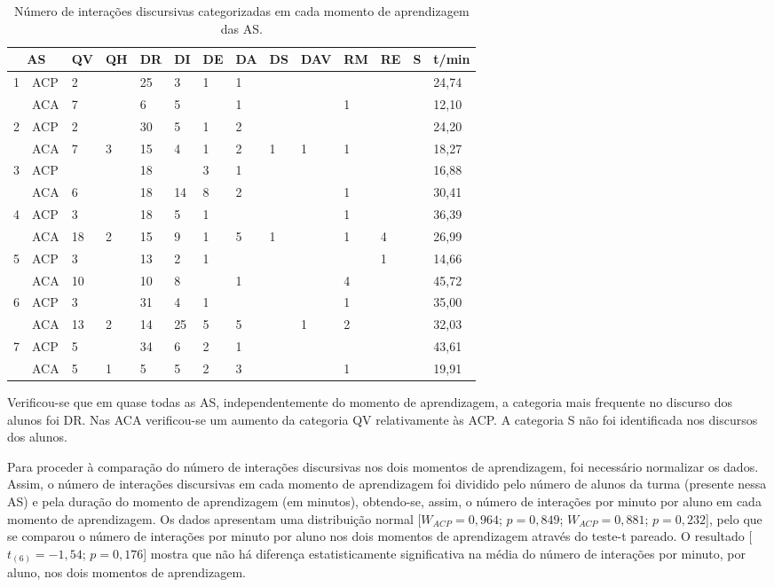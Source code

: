\documentclass[portuguese]{textolivre}
\begin{document}
\begin{table}[htb]
\caption{Número de interações discursivas categorizadas em cada momento de aprendizagem das AS.}
\label{tab2}
\centering
\begin{tabular}{llllllllllllll}
\toprule
\multicolumn{2}{c}{AS} & QV & QH & DR & DI & DE & DA & DS & DAV & RM & RE & S & t/min
\\
\midrule
\multirow{2}{*}{1} & ACP & 2 & & 25 & 3 & 1 & 1 & & & & & & 24,74
\\
& ACA & 7 & & 6 & 5 &  & 1 & & & 1 & & & 12,10
\\
\hline
\multirow{2}{*}{2} & ACP & 2 & & 30 & 5 & 1 & 2 & & & & & & 24,20
\\
& ACA & 7 & 3 & 15 & 4 & 1 & 2 & 1 & 1 & 1 & & & 18,27
\\
\hline
\multirow{2}{*}{3} & ACP & & & 18 & & 3 & 1 & & & & & & 16,88
\\
& ACA & 6 & & 18 & 14 & 8 & 2 & & & 1 & & & 30,41
\\
\hline
\multirow{2}{*}{4} & ACP & 3 & & 18 & 5 & 1 & & & & 1 & & & 36,39
\\
& ACA & 18 & 2 & 15 & 9 & 1 & 5 & 1 & & 1 & 4 & & 26,99
\\
\hline
\multirow{2}{*}{5} & ACP & 3 & & 13 & 2 & 1 & & & & & 1 & & 14,66
\\
& ACA & 10 & & 10 & 8 & & 1 & & & 4 & & & 45,72
\\
\hline
\multirow{2}{*}{6} & ACP & 3 & & 31 & 4 & 1 & & & & 1 & & & 35,00
\\
& ACA & 13 & 2 & 14 & 25 & 5 & 5 & & 1 & 2 & & & 32,03
\\
\hline
\multirow{2}{*}{7} & ACP & 5 & & 34 & 6 & 2 & 1 & & & & & & 43,61
\\
& ACA & 5 & 1 & 5 & 5 & 2 & 3 & & & 1 & & & 19,91
\\
\bottomrule
\end{tabular}
\centering
{}
\end{table}

Verificou-se que em quase todas as AS, independentemente do momento de aprendizagem, a categoria mais frequente no discurso dos alunos foi DR. Nas ACA verificou-se um aumento da categoria QV relativamente às ACP. A categoria S não foi identificada nos discursos dos alunos. 

Para proceder à comparação do número de interações discursivas nos dois momentos de aprendizagem, foi necessário normalizar os dados. Assim, o número de interações discursivas em cada momento de aprendizagem foi dividido pelo número de alunos da turma (presente nessa AS) e pela duração do momento de aprendizagem (em minutos), obtendo-se, assim, o número de interações por minuto por aluno em cada momento de aprendizagem. Os dados apresentam uma distribuição normal [$W_{ACP}=0,964$; $p=0,849$; $W_{ACP}=0,881$; $p=0,232$], pelo que se comparou o número de interações por minuto por aluno nos dois momentos de aprendizagem através do teste-t pareado. O resultado [$t_{(6)}=-1,54$; $p=0,176$] mostra que não há diferença estatisticamente significativa na média do número de interações por minuto, por aluno, nos dois momentos de aprendizagem. 
\end{document}
